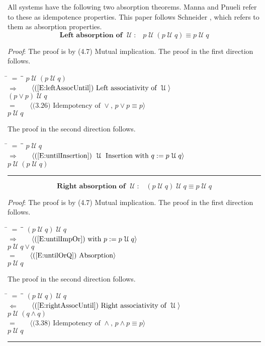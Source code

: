 \documentclass[12pt, fleqn, leqno]{article}
\newcommand{\lgap}{2pt}                             %
\newcommand{\mymathindent}{24pt}                    %
\newcommand{\impl}{\ensuremath{\Rightarrow}}        %
\newcommand{\foll}{\ensuremath{\Leftarrow}}         %
\newcommand{\Until}{\;\mathcal{U}\;}
\newcommand{\myqed}{\rule[-.23ex]{1.2ex}{2.0ex}}
\newcommand{\myqedtab}{\hspace{384pt}}              %
\newcommand{\Gll} {\langle}                         %
\newcommand{\Ggg} {\rangle}                         %
\newcommand{\Hint}[1]     {\ \ \ $\Gll              \mbox{#1} \Ggg$ }   %
\begin{document}
All systems have the following two absorption theorems.
Manna and Pnueli \cite{Manna} refer to these as idempotence properties.
This paper follows Schneider \cite{Schn}, which refers to them as absorption properties.
\begin{equation}\label{E:untilIdem}
\textbf{Left absorption of $\Until$:}\quad p \Until (p \Until q) \equiv p \Until q
\end{equation}

\emph{Proof}: The proof is by (4.7) Mutual implication.
The proof in the first direction follows.
\begin{tabbing}
\hspace{\mymathindent} \= $= \;$ \= \myqedtab \= \kill
\> \> $p \Until (p \Until q)$\\[\lgap]
\> $\impl$ \> \Hint{(\ref{E:leftAssocUntil}) Left associativity of $\Until$} \\[\lgap]
\> \> $(p\lor p) \Until q$\\[\lgap]
\> $=$ \> \Hint{(3.26) Idempotency of $\lor$, $p \lor p \equiv p$} \\[\lgap]
\> \> $p \Until q$ \\
\end{tabbing}
The proof in the second direction follows.
\begin{tabbing}
\hspace{\mymathindent} \= $= \;$ \= \myqedtab \= \kill
\> \> $p \Until q$\\[\lgap]
\> $\impl$ \> \Hint{(\ref{E:untilInsertion}) $\Until$ Insertion with $q:=p\Until q$} \\[\lgap]
\> \> $p \Until (p \Until q)$ \quad \myqed
\end{tabbing}
\begin{equation}\label{E:untilIdemR}
\textbf{Right absorption of $\Until$:}\quad (p \Until q) \Until q \equiv p \Until q
\end{equation}

\emph{Proof}: The proof is by (4.7) Mutual implication.
The proof in the first direction follows.
\begin{tabbing}
\hspace{\mymathindent} \= $= \;$ \= \myqedtab \= \kill
\> \> $(p \Until q) \Until q$\\[\lgap]
\> $\impl$ \> \Hint{(\ref{E:untilImpOr}) with $p:=p\Until q$} \\[\lgap]
\> \> $p \Until q \lor q$\\[\lgap]
\> $=$ \> \Hint{(\ref{E:untilOrQ}) Absorption} \\[\lgap]
\> \> $p\Until q$
\end{tabbing}
The proof in the second direction follows.
\begin{tabbing}
\hspace{\mymathindent} \= $= \;$ \= \myqedtab \= \kill
\> \> $(p \Until q) \Until q$\\[\lgap]
\> $\foll$ \> \Hint{(\ref{E:rightAssocUntil}) Right associativity of $\Until$} \\[\lgap]
\> \> $p \Until (q \land q)$\\[\lgap]
\> $=$  \>  \Hint{(3.38) Idempotency of $\land$, $p\land p \equiv p$}\\[\lgap]
\> \> $p \Until q$ \quad \myqed
\end{tabbing}
\end{document}
